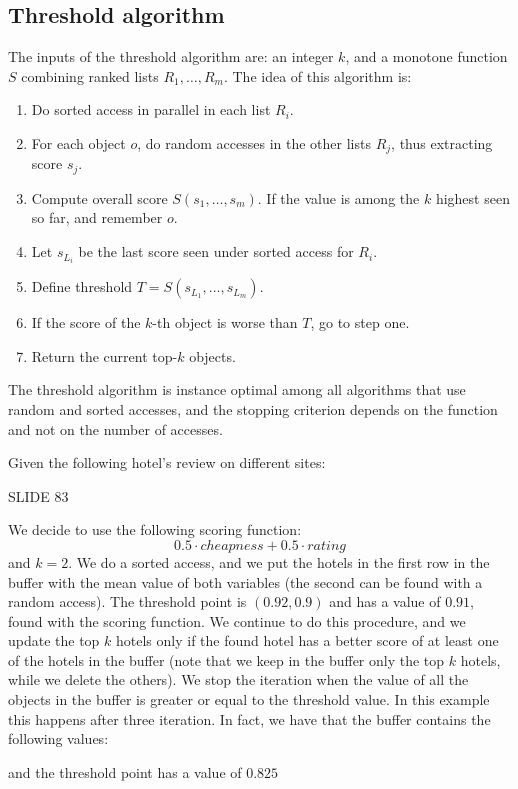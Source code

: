 \documentclass[12pt, a4paper]{report}
\newtheorem[style=M,bodystyle=\normalfont]{theorem}{Theorem}
\newtheorem[style=M,bodystyle=\normalfont]{corollary}{Corollary}
\newtheorem[style=M,bodystyle=\normalfont]{lemma}{Lemma}
\newtheorem[style=M,bodystyle=\normalfont]{definition}{Definition}
\begin{document}
    \subsection{Threshold algorithm}
    The inputs of the threshold algorithm are: an integer $k$, and a monotone function $S$ combining ranked lists $R_1,\dots,R_m$. 
    The idea of this algorithm is: 
    \begin{enumerate}
        \item Do sorted access in parallel in each list $R_i$. 
        \item For each object $o$, do random accesses in the other lists $R_j$, thus extracting score $s_j$. 
        \item Compute overall score $S(s_1, \dots, s_m)$. If the value is among the $k$ highest seen so far, and remember $o$. 
        \item Let $s_{L_i}$ be the last score seen under sorted access for $R_i$. 
        \item Define threshold $T=S(s_{L_1}, \dots, s_{L_m})$. 
        \item If the score of the $k$-th object is worse than $T$, go to step one. 
        \item Return the current top-$k$ objects. 
    \end{enumerate}
    The threshold algorithm is instance optimal among all algorithms that use random and sorted accesses, and the stopping criterion depends 
    on the function and not on the number of accesses. 
    \begin{example}
        Given the following hotel's review on different sites: 
        
        SLIDE 83

        We decide to use the following scoring function: 
        \[0.5 \cdot cheapness+0.5 \cdot rating\]
        and $k=2$. We do a sorted access, and we put the hotels in the first row in the buffer with the mean value of both variables (the 
        second can be found with a random access). The threshold point is $(0.92,0.9)$ and has a value of $0.91$, found with the scoring 
        function. We continue to do this procedure, and we update the top $k$ hotels only if the found hotel has a better score of at least
        one of the hotels in the buffer (note that we keep in the buffer only the top $k$ hotels, while we delete the others). 
        We stop the iteration when the value of all the objects in the buffer is greater or equal to the threshold value. In this example this
        happens after three iteration. In fact, we have that the buffer contains the following values: 

        and the threshold point has a value of $0.825$
    \end{example}
\end{document}
